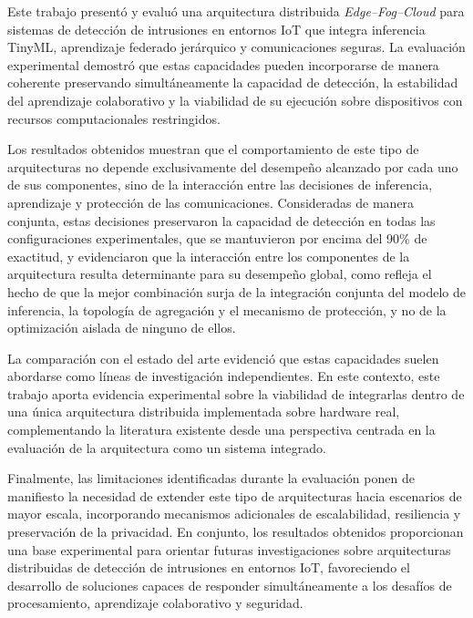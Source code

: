 \documentclass[journal,article,submit,moreauthors]{Definitions/mdpi}
\begin{document}
Este trabajo presentó y evaluó una arquitectura distribuida \textit{Edge--Fog--Cloud} para sistemas de detección de intrusiones en entornos IoT que integra inferencia TinyML, aprendizaje federado jerárquico y comunicaciones seguras. La evaluación experimental demostró que estas capacidades pueden incorporarse de manera coherente preservando simultáneamente la capacidad de detección, la estabilidad del aprendizaje colaborativo y la viabilidad de su ejecución sobre dispositivos con recursos computacionales restringidos.

Los resultados obtenidos muestran que el comportamiento de este tipo de arquitecturas no depende exclusivamente del desempeño alcanzado por cada uno de sus componentes, sino de la interacción entre las decisiones de inferencia, aprendizaje y protección de las comunicaciones. Consideradas de manera conjunta, estas decisiones preservaron la capacidad de detección en todas las configuraciones experimentales, que se mantuvieron por encima del 90\% de exactitud, y evidenciaron que la interacción entre los componentes de la arquitectura resulta determinante para su desempeño global, como refleja el hecho de que la mejor combinación surja de la integración conjunta del modelo de inferencia, la topología de agregación y el mecanismo de protección, y no de la optimización aislada de ninguno de ellos.

La comparación con el estado del arte evidenció que estas capacidades suelen abordarse como líneas de investigación independientes. En este contexto, este trabajo aporta evidencia experimental sobre la viabilidad de integrarlas dentro de una única arquitectura distribuida implementada sobre hardware real, complementando la literatura existente desde una perspectiva centrada en la evaluación de la arquitectura como un sistema integrado.

Finalmente, las limitaciones identificadas durante la evaluación ponen de manifiesto la necesidad de extender este tipo de arquitecturas hacia escenarios de mayor escala, incorporando mecanismos adicionales de escalabilidad, resiliencia y preservación de la privacidad. En conjunto, los resultados obtenidos proporcionan una base experimental para orientar futuras investigaciones sobre arquitecturas distribuidas de detección de intrusiones en entornos IoT, favoreciendo el desarrollo de soluciones capaces de responder simultáneamente a los desafíos de procesamiento, aprendizaje colaborativo y seguridad.

\vspace{6pt}
\end{document}
